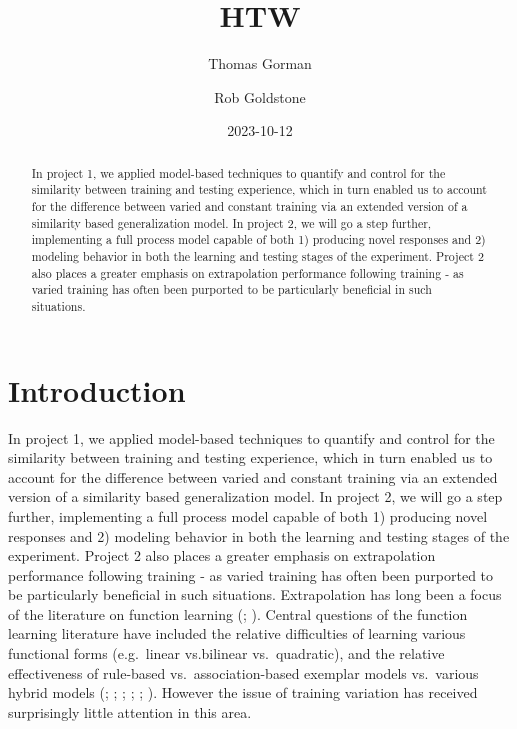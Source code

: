\documentclass[
  letterpaper,
  DIV=11,
  numbers=noendperiod,
  oneside]{scrartcl}
\title{HTW}
\author{Thomas Gorman \and Rob Goldstone}
\date{2023-10-12}
\renewcommand*\contentsname{Table of contents}
\newcommand\contentsname{Table of contents}
\begin{document}
\maketitle
\begin{abstract}
In project 1, we applied model-based techniques to quantify and control
for the similarity between training and testing experience, which in
turn enabled us to account for the difference between varied and
constant training via an extended version of a similarity based
generalization model. In project 2, we will go a step further,
implementing a full process model capable of both 1) producing novel
responses and 2) modeling behavior in both the learning and testing
stages of the experiment. Project 2 also places a greater emphasis on
extrapolation performance following training - as varied training has
often been purported to be particularly beneficial in such situations.
\end{abstract}
\renewcommand*\contentsname{Table of contents}
{
\hypersetup{linkcolor=}
\setcounter{tocdepth}{3}
\tableofcontents
}
\section{Introduction}\label{introduction}

In project 1, we applied model-based techniques to quantify and control
for the similarity between training and testing experience, which in
turn enabled us to account for the difference between varied and
constant training via an extended version of a similarity based
generalization model. In project 2, we will go a step further,
implementing a full process model capable of both 1) producing novel
responses and 2) modeling behavior in both the learning and testing
stages of the experiment. Project 2 also places a greater emphasis on
extrapolation performance following training - as varied training has
often been purported to be particularly beneficial in such situations.
Extrapolation has long been a focus of the literature on function
learning (; ). Central questions of the function learning literature have
included the relative difficulties of learning various functional forms
(e.g.~linear vs.bilinear vs.~quadratic), and the relative effectiveness
of rule-based vs.~association-based exemplar models vs.~various hybrid
models (; ; ; ; ;
). However the issue of training variation has received
surprisingly little attention in this area.
\end{document}
